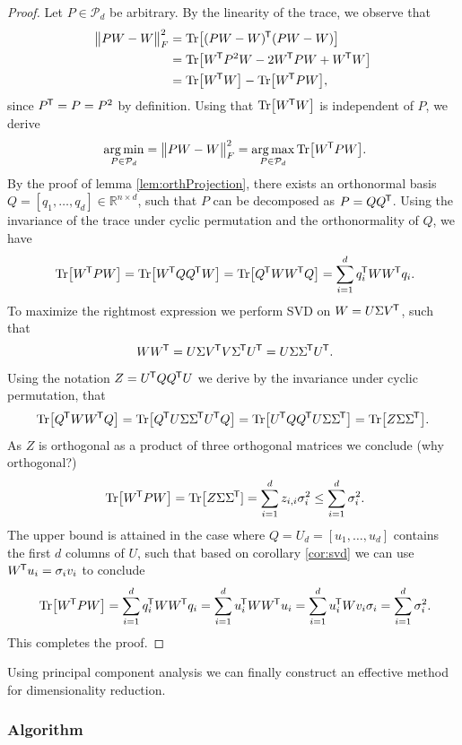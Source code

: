 \documentclass[11pt, a4paper]{article}
\newcommand{\R}{\mathbb{R}}
\renewcommand{\P}{\mathcal{P}}
\newcommand*{\tr}{^{\mkern-1.5mu\mathsf{T}}}
\DeclareMathOperator*{\argmin}{arg\,min}
\DeclareMathOperator*{\argmax}{arg\,max}
\begin{document}
\begin{proof}
Let $P \in \P_d$ be arbitrary. By the linearity of the trace, we observe that
\[ \begin{split}
\big \| PW - W \big \|_F^2 
&= \text{Tr} \big [ (PW-W)\tr (PW-W) \big ] \\\
&= \text{Tr} \big [ W\tr  P^2 W - 2 W\tr PW + W\tr W \big ] \\\
&= \text{Tr} \big [ W\tr W\big ] - \text{Tr} \big [W\tr PW \big ],
\end{split} \]
since $P\tr =P=P^2$ by definition. Using that $\text{Tr} \big [ W\tr W\big ]$ is independent of $P$, we derive
\[ \argmin_{P \in \P_d} = \big \| PW-W \big \|_F^2 = \argmax_{P \in \P_d} \text{Tr} \big [ W\tr PW\big ]. \]
By the proof of lemma \ref{lem:orthProjection}, there exists an orthonormal basis $Q = [q_1, \dots, q_d] \in \R^{n \times d}$, such that $P$ can be decomposed as $P=QQ\tr $. Using the invariance of the trace under cyclic permutation and the orthonormality of $Q$, we have
\[ \text{Tr} \big [ W\tr PW \big ] = \text{Tr} \big [ W\tr QQ\tr W \big ] = \text{Tr} \big [ Q\tr WW\tr Q \big ] = \sum_{i=1}^{d} q_i\tr WW\tr q_i. \]
To maximize the rightmost expression we perform SVD on $W = U \Sigma V\tr $, such that
\[ WW\tr  = U \Sigma V\tr  V \Sigma\tr  U\tr  = U \Sigma \Sigma\tr  U\tr . \]
Using the notation $Z = U\tr QQ\tr U$ we derive by the invariance under cyclic permutation, that
\[ \text{Tr} \big [ Q\tr WW\tr Q \big ] = \text{Tr} \big [ Q\tr U \Sigma \Sigma\tr  U\tr Q \big ] = \text{Tr} \big [ U\tr QQ\tr U\Sigma \Sigma\tr  \big ] = \text{Tr} \big [ Z \Sigma \Sigma\tr  \big ]. \]
As $Z$ is orthogonal as a product of three orthogonal matrices we conclude (why orthogonal?)
\[  \text{Tr} \big [ W\tr PW \big ] = \text{Tr} \big [ Z \Sigma \Sigma\tr  ] = \sum_{i=1}^{d} z_{i,i} \sigma_i^2 \leq \sum_{i=1}^{d} \sigma_i^2. \]
The upper bound is attained in the case where $Q = U_d = [u_1, \dots, u_d]$ contains the first $d$ columns of $U$, such that based on corollary \ref{cor:svd} we can use $W\tr u_i = \sigma_iv_i$ to conclude
\[ \text{Tr} \big [ W\tr PW \big ] = \sum_{i=1}^{d} q_i\tr WW\tr q_i = \sum_{i=1}^{d} u_i\tr WW\tr u_i = \sum_{i=1}^{d} u_i\tr W v_i \sigma_i = \sum_{i=1}^{d} \sigma_i^2. \]
This completes the proof.
\end{proof}

Using principal component analysis we can finally construct an effective method for dimensionality reduction.

\subsubsection{Algorithm}
\end{document}
